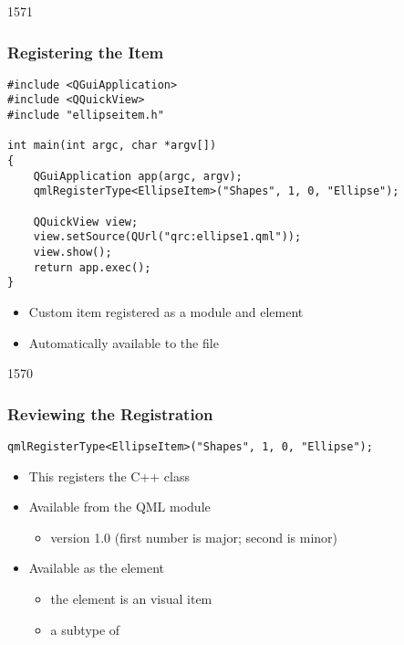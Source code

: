 \begin{slide}[fragile]{1571}\frametitle{Registering the Item}

\begin{lstlisting}
#include <QGuiApplication>
#include <QQuickView>
#include "ellipseitem.h"

int main(int argc, char *argv[])
{
    QGuiApplication app(argc, argv);
    qmlRegisterType<EllipseItem>("Shapes", 1, 0, "Ellipse");

    QQuickView view;
    view.setSource(QUrl("qrc:ellipse1.qml"));
    view.show();
    return app.exec();
}
\end{lstlisting}

\begin{itemize}
\item Custom item registered as a module and element
\item Automatically available to the  file
\end{itemize}

\end{slide}

\begin{slide}[fragile]{1570}\frametitle{Reviewing the Registration}

\medskip
\begin{lstlisting}
qmlRegisterType<EllipseItem>("Shapes", 1, 0, "Ellipse");
\end{lstlisting}

\medskip
\medskip

\begin{itemize}
\item  This registers the  C++ class
\medskip
\item Available from the  QML module
  \begin{itemize}
  \item version 1.0 (first number is major; second is minor)
  \end{itemize}
\item Available as the  element
  \begin{itemize}
  \item the  element is an visual item
  \item a subtype of 
  \end{itemize}
\end{itemize}

\end{slide}

